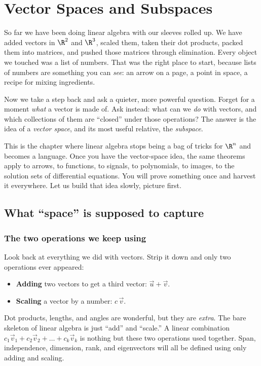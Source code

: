 \chapter{Vector Spaces and Subspaces}

So far we have been doing linear algebra with our sleeves rolled up. We have added
vectors in $\R^2$ and $\R^3$, scaled them, taken their dot products, packed them into
matrices, and pushed those matrices through elimination. Every object we touched was a
list of numbers. That was the right place to start, because lists of numbers are
something you can \emph{see}: an arrow on a page, a point in space, a recipe for mixing
ingredients.

Now we take a step back and ask a quieter, more powerful question. Forget for a moment
\emph{what} a vector is made of. Ask instead: what can we \emph{do} with vectors, and
which collections of them are ``closed'' under those operations? The answer is the idea
of a \emph{vector space}, and its most useful relative, the \emph{subspace}.

This is the chapter where linear algebra stops being a bag of tricks for $\R^n$ and
becomes a language. Once you have the vector-space idea, the same theorems apply to
arrows, to functions, to signals, to polynomials, to images, to the solution sets of
differential equations. You will prove something once and harvest it everywhere. Let us
build that idea slowly, picture first.

\chapterline

\section{What ``space'' is supposed to capture}

\subsection{The two operations we keep using}

Look back at everything we did with vectors. Strip it down and only two operations ever
appeared:

\begin{itemize}
  \item \textbf{Adding} two vectors to get a third vector: $\vec{u} + \vec{v}$.
  \item \textbf{Scaling} a vector by a number: $c\,\vec{v}$.
\end{itemize}

Dot products, lengths, and angles are wonderful, but they are \emph{extra}. The bare
skeleton of linear algebra is just ``add'' and ``scale.'' A linear combination
$c_1\vec{v}_1 + c_2\vec{v}_2 + \dots + c_k\vec{v}_k$ is nothing but these two operations
used together. Span, independence, dimension, rank, and eigenvectors will all be defined
using only adding and scaling.


